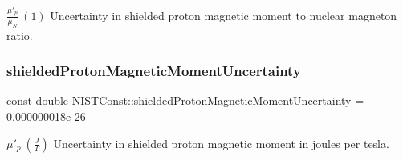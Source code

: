 $\frac{\mu'_p}{\mu_N} \ (1)$ Uncertainty in shielded proton magnetic moment to nuclear magneton ratio. \mbox{\label{group___proton_gafe8c348ee7683aa218402bf235838fbf}} 
\subsubsection{\texorpdfstring{shielded\+Proton\+Magnetic\+Moment\+Uncertainty}{shieldedProtonMagneticMomentUncertainty}}
{\footnotesize\ttfamily const double N\+I\+S\+T\+Const\+::shielded\+Proton\+Magnetic\+Moment\+Uncertainty = 0.\+000000018e-\/26}

$\mu'_p \ (\frac{J}{T})$ Uncertainty in shielded proton magnetic moment in joules per tesla. 